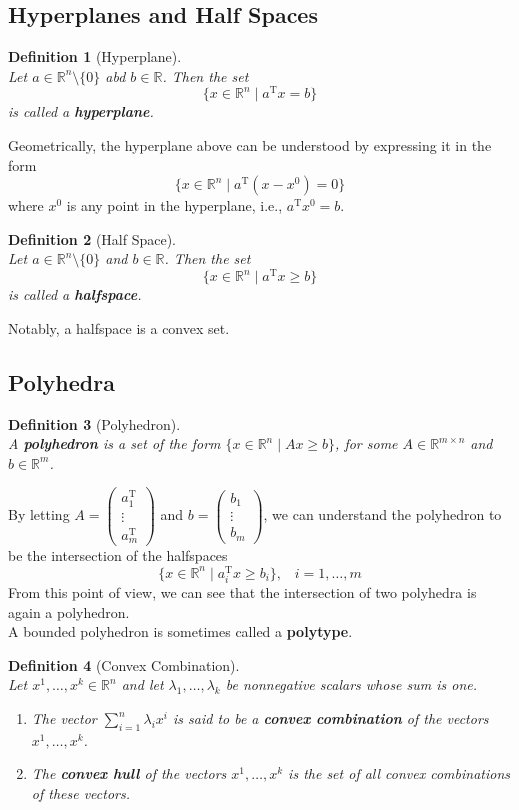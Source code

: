 \documentclass[12pt]{article}
\newcommand{\T}{\mathrm{T}}
\newtheorem{definition}{Definition}[section]
\theoremstyle{definition}
\begin{document}
\subsection{Hyperplanes and Half Spaces}
\begin{definition}[Hyperplane]
\hfill\\\normalfont Let $a\in\mathbb{R}^n\setminus\{0\}$ abd $b\in\mathbb{R}$. Then the set 
\[
\{x\in\mathbb{R}^n \mid a^\T x = b\}
\]
is called a \textbf{hyperplane}.
\end{definition}
Geometrically, the hyperplane above can be understood by expressing it in the form
\[
\{x\in\mathbb{R}^n\mid a^\T(x-x^0) = 0\}
\]
where $x^0$ is any point in the hyperplane, i.e., $a^\T x^0=b$.
\begin{definition}[Half Space]
\hfill\\\normalfont Let $a\in\mathbb{R}^n\setminus\{0\}$ and $b\in\mathbb{R}$. Then the set
\[
\{x\in\mathbb{R}^n\mid a^\T x\geq b\}
\]
is called a \textbf{halfspace}.
\end{definition}
Notably, a halfspace is a convex set.
\subsection{Polyhedra}
\begin{definition}[Polyhedron]
\hfill\\\normalfont A \textbf{polyhedron} is a set of the form $\{x\in\mathbb{R}^n\mid Ax\geq b\}$, for some $A\in\mathbb{R}^{m\times n}$ and $b\in\mathbb{R}^m$.
\end{definition}
By letting $A=\begin{pmatrix} a_1^\T\\\vdots\\ a_m^\T\end{pmatrix}$ and $b=\begin{pmatrix} b_1\\\vdots\\b_m\end{pmatrix}$, we can understand the polyhedron to be the intersection of the halfspaces
\[
\{x\in\mathbb{R}^n \mid a_i^\T x\geq b_i\}, \;\;\; i = 1,\ldots, m
\]
From this point of view, we can see that the intersection of two polyhedra is again a polyhedron.\\
A bounded polyhedron is sometimes called a \textbf{polytype}.
\begin{definition}[Convex Combination]
\hfill\\\normalfont Let $x^1,\ldots, x^k\in\mathbb{R}^n$ and let $\lambda_1,\ldots, \lambda_k$ be nonnegative scalars whose sum is one.
\begin{enumerate}
  \item The vector $\sum_{i=1}^n \lambda_ix^i$ is said to be a \textbf{convex combination} of the vectors $x^1,\ldots, x^k$.
  \item The \textbf{convex hull} of the vectors $x^1,\ldots, x^k$ is the set of all convex combinations of these vectors.
\end{enumerate}
\end{definition}
\end{document}
